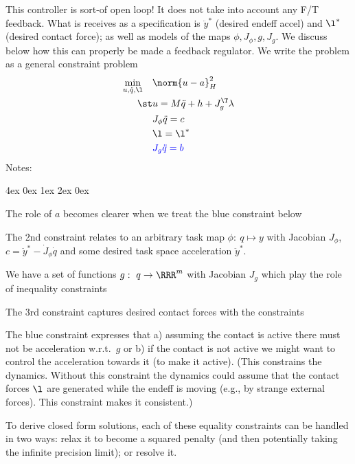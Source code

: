 \documentclass[10pt,fleqn,twoside]{article}
\newenvironment{items}{
\par\small
\begin{list}{--}{\leftmargin4ex \rightmargin0ex \labelsep1ex \labelwidth2ex
\topsep0pt \parsep0ex \itemsep3pt}
}{
\end{list}
}
\begin{document}
This controller is sort-of open loop! It does not take into account any F/T
feedback. What is receives as a specification is $\ddot y^*$ (desired
endeff accel) and $\l^*$ (desired contact force); as well as models of
the maps $\phi, J_\phi, g, J_g$. We discuss below how this can properly
be made a feedback regulator. We write the problem as a general constraint problem
\begin{align}
\min_{u, \ddot q, \l}\quad
 & \norm{u-a}^2_H \\
\st
 & u = M \ddot q + h + J_g^\T \lambda \\
 & J_\phi\ddot q = c \\
 & \l = \l^* \\
 & \color{blue}J_g\ddot q = b
\end{align}
Notes:
\begin{items}
\item The role of $a$ becomes clearer when we treat the blue
constraint below
\item The 2nd constraint relates to an arbitrary task map
$\phi:~ q \mapsto y$ with Jacobian $J_\phi$, $c = \ddot y^* - \dot
J_\phi \dot q$ and some desired task space acceleration $\ddot y^*$.
\item We have a set of functions $g:~ q \to \RRR^m$ with Jacobian
$J_g$ which play the role of inequality constraints
\item The 3rd constraint captures desired contact forces with the constraints
\item The blue constraint expresses that a) assuming the contact is
active there must not be acceleration w.r.t.\ $g$ or b) if the contact
is not active we might want to control the acceleration towards it
(to make it active). (This constrains the dynamics. Without this
constraint the dynamics could assume that the contact forces $\l$ are
generated while the endeff is moving (e.g., by strange external
forces). This constraint makes it consistent.)
\end{items}

To derive closed form solutions, each of these equality constraints
can be handled in two ways: relax it to become a squared penalty
(and then potentially taking the infinite precision limit); or
resolve it.
\end{document}
